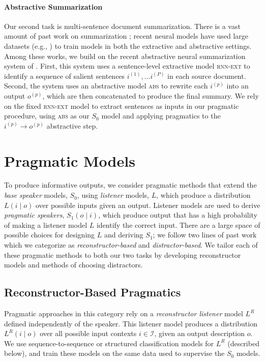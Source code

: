 \documentclass[11pt,a4paper]{article}
\newcommand{\basespk}[0]{$S_0$\xspace}
\newcommand{\eg}{e.g., }
\begin{document}
\paragraph{Abstractive Summarization}
Our second task is multi-sentence document summarization. There is a vast amount of past work on summarization \cite{nenkova2011automatic}; recent neural models have used large datasets (\eg \citet{hermann2015teaching}) to train models in both the extractive \cite{cheng2016summarization,nallapati2017summarunner} and abstractive  \cite{rush2015abstractive,see2017summarization} settings.
Among these works, we build on the recent abstractive neural summarization system of . First, this system uses a sentence-level extractive model \textsc{rnn-ext} to identify a sequence of salient sentences $i^{(1)}, \ldots i^{(P)}$ in each source document. Second, the system uses an abstractive model \textsc{abs} to rewrite each $i^{(p)}$ into an output $o^{(p)}$, which are then concatenated to produce the final summary. We rely on the fixed \textsc{rnn-ext} model to extract sentences as inputs in our pragmatic procedure, using \textsc{abs} as our \basespk model and applying pragmatics to the $i^{(p)} \rightarrow o^{(p)}$ abstractive step.



 \section{Pragmatic Models}
\label{sec:pragmatic_models}

To produce informative outputs, we consider pragmatic methods that extend the \emph{base speaker} models, \basespk, using \emph{listener} models, $L$, which produce a distribution $L(i \mid o)$ over possible inputs given an output. Listener models are used to derive \emph{pragmatic speakers}, $S_1(o \mid i)$, which produce output that has a high probability of making a listener model $L$ identify the correct input. 
There are a large space of possible choices for designing $L$ and deriving $S_1$; we follow two lines of past work which we categorize as \emph{reconstructor-based} and \emph{distractor-based}.
We tailor each of these pragmatic methods to both our two tasks by developing reconstructor models and methods of choosing distractors.


\subsection{Reconstructor-Based Pragmatics}
\label{sec:pragr}
Pragmatic approaches in this category \cite{duvsek2016sequence,fried2017unified} rely on a \emph{reconstructor listener} model $L^R$ defined independently of the speaker. This listener model produces a distribution $L^R(i \mid o)$ over 
all possible input contexts $i \in \mathcal{I}$, given an output description $o$. We use sequence-to-sequence or structured classification models for $L^R$ (described below), and train these models on the same data used to supervise the $S_0$ models. 
\end{document}
